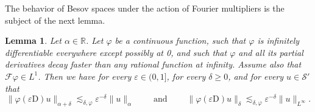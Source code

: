 \documentclass[11pt,a4paper]{article}
\newcommand{\mathD}{\mathrm{D}}
\newcommand{\tmop}[1]{\ensuremath{\operatorname{#1}}}
\newtheorem{lemma}[theorem]{Lemma}
\theoremstyle{remark}
\newcommand{\CF}{\ensuremath{\mathscr{F}}}
\newcommand{\CS}{\ensuremath{\mathscr{S}}}
\begin{document}
The behavior of Besov spaces under the action of Fourier multipliers is the subject of the next lemma.

\begin{lemma}\label{lemma:fourier multiplier smoothing}
   Let $\alpha \in \mathbb{R}$. Let $\varphi$ be a continuous function, such that $\varphi$ is infinitely differentiable everywhere except possibly at 0, and such that $\varphi$ and all its partial derivatives decay faster than any rational function at infinity. Assume also that $\CF \varphi \in L^{1}$. Then we have for every $\varepsilon \in (0,1]$, for every $\delta \geqslant 0$, and for every $u \in \CS'$ that
  \[
     \| \varphi ( \varepsilon \mathD ) u \|_{\alpha + \delta} \lesssim_{\delta, \varphi} \varepsilon^{- \delta} \| u \|_{\alpha} \hspace{2em} \tmop{and} \hspace{2em} \| \varphi ( \varepsilon \mathD ) u \|_{\delta}  \lesssim_{\delta , \varphi} \varepsilon^{- \delta} \| u \|_{L^{\infty}} .
  \]
\end{lemma}
\end{document}
